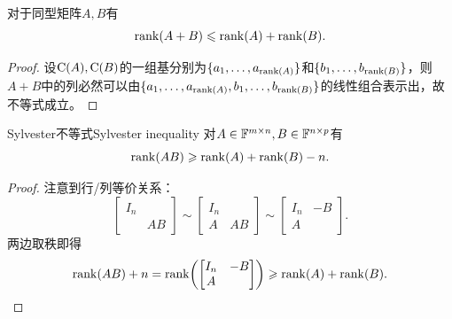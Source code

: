 

\begin{theorem}{}{}
	对于同型矩阵$A,B$有
	\begin{equation}
		\operatorname{rank}(A + B) \leqslant \operatorname{rank}(A) + \operatorname{rank}(B).
	\end{equation}
\end{theorem}
\begin{proof}
	设$\operatorname{C}(A),\operatorname{C}(B)$的一组基分别为$\{a_1,\ldots,a_{\operatorname{rank}(A)}\}$和$\{b_1,\ldots,b_{\operatorname{rank}(B)}\}$，则$A + B$中的列必然可以由$\{a_1,\ldots,a_{\operatorname{rank}(A)},b_1,\ldots,b_{\operatorname{rank}(B)}\}$的线性组合表示出，故不等式成立。
\end{proof}
\begin{theorem}{Sylvester不等式}{Sylvester inequality}
	对$A \in \mathbb{F}^{m\times n},B \in \mathbb{F}^{n\times p}$有
	\begin{equation}
		\label{eqn:Sylvester inequality}
		\operatorname{rank}(AB) \geqslant \operatorname{rank}(A) + \operatorname{rank}(B) - n.
	\end{equation}
\end{theorem}
\begin{proof}
	注意到行/列等价关系：
	\[
		\begin{bmatrix}
			I_n\\ &AB
		\end{bmatrix} \sim \begin{bmatrix}
			I_n\\A&AB
		\end{bmatrix} \sim \begin{bmatrix}
			I_n&-B\\A
		\end{bmatrix}.
	\]
	两边取秩即得
	\[
		\operatorname{rank}(AB) + n = \operatorname{rank}\biggl(\begin{bmatrix}
			I_n&-B\\A
		\end{bmatrix}\biggr) \geqslant \operatorname{rank}(A) + \operatorname{rank}(B).
		\qedhere
	\]
\end{proof}

